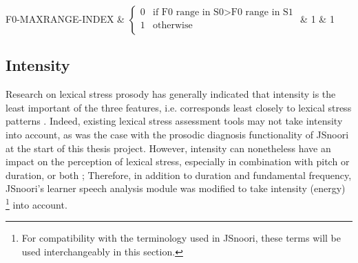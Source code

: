 \begin{table}
{\begin{tabularx}{\textwidth}
		F0-MAXRANGE-INDEX	
			& $\begin{cases}
					0 & \text{if F0 range in S0}>\text{F0 range in S1}\\
					1 & \text{otherwise}\\
				\end{cases}$
			& 1   & 1 \\
		\bottomrule
		\end{tabularx}
		\label{tab:f0features}
		} %
\end{table}


	\subsection{Intensity}
	\label{sec:prosody:intensity}
	
		
		Research on lexical stress prosody has generally indicated that intensity is the least important of the three features, i.e. corresponds least closely to lexical stress patterns \citep{Cutler2005}. 
Indeed, existing lexical stress assessment tools may not take intensity into account, as 
was the case with the prosodic diagnosis functionality of JSnoori at the start of this thesis project.
However, intensity can nonetheless have an impact on the perception of lexical stress, especially in combination with pitch or duration, or both \citep{Cutler2005}; %
Therefore, in addition to duration and fundamental frequency,
 JSnoori's learner speech analysis module was modified to take intensity (energy)%
 \footnote{ For compatibility with the terminology used in JSnoori, these terms will be used interchangeably in this section.} 
 into account.





